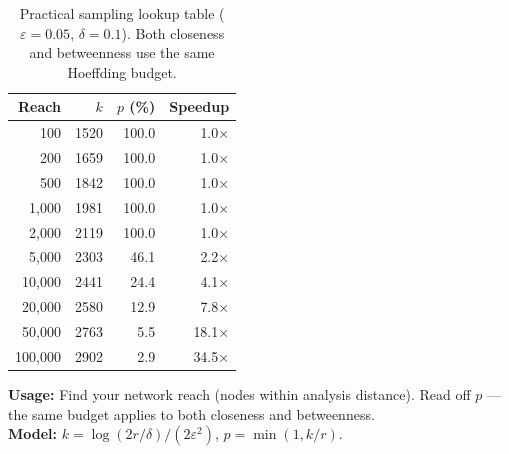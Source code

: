 \begin{table}[htbp]
\centering
\caption{Practical sampling lookup table ($\varepsilon = 0.05$, $\delta = 0.1$).
Both closeness and betweenness use the same Hoeffding budget.}
\label{tab:lookup}
\begin{tabular}{rrrr}
\toprule
\textbf{Reach} & \textbf{$k$} & \textbf{$p$ (\%)} & \textbf{Speedup} \\
\midrule
100 & 1520 & 100.0 & 1.0$\times$ \\
200 & 1659 & 100.0 & 1.0$\times$ \\
500 & 1842 & 100.0 & 1.0$\times$ \\
1{,}000 & 1981 & 100.0 & 1.0$\times$ \\
2{,}000 & 2119 & 100.0 & 1.0$\times$ \\
5{,}000 & 2303 & 46.1 & 2.2$\times$ \\
10{,}000 & 2441 & 24.4 & 4.1$\times$ \\
20{,}000 & 2580 & 12.9 & 7.8$\times$ \\
50{,}000 & 2763 & 5.5 & 18.1$\times$ \\
100{,}000 & 2902 & 2.9 & 34.5$\times$ \\
\bottomrule
\end{tabular}

\vspace{0.5em}
\footnotesize
\textbf{Usage:} Find your network reach (nodes within analysis distance).
Read off $p$ — the same budget applies to both closeness and betweenness.\\
\textbf{Model:} $k = \log(2r/\delta) / (2\varepsilon^2)$, $p = \min(1, k/r)$.
\end{table}
